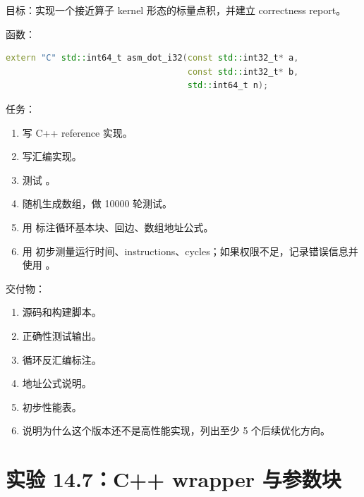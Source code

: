 \begin{labbox}
目标：实现一个接近算子 kernel 形态的标量点积，并建立 correctness report。

函数：

\begin{lstlisting}[language=C++]
extern "C" std::int64_t asm_dot_i32(const std::int32_t* a,
                                    const std::int32_t* b,
                                    std::int64_t n);
\end{lstlisting}

任务：

\begin{enumerate}
  \item 写 C++ reference 实现。
  \item 写汇编实现。
  \item 测试 。
  \item 随机生成数组，做 10000 轮测试。
  \item 用  标注循环基本块、回边、数组地址公式。
  \item 用  初步测量运行时间、instructions、cycles；如果权限不足，记录错误信息并使用 。
\end{enumerate}

交付物：

\begin{enumerate}
  \item 源码和构建脚本。
  \item 正确性测试输出。
  \item 循环反汇编标注。
  \item 地址公式说明。
  \item 初步性能表。
  \item 说明为什么这个版本还不是高性能实现，列出至少 5 个后续优化方向。
\end{enumerate}
\end{labbox}

\section{实验 14.7：C++ wrapper 与参数块}

